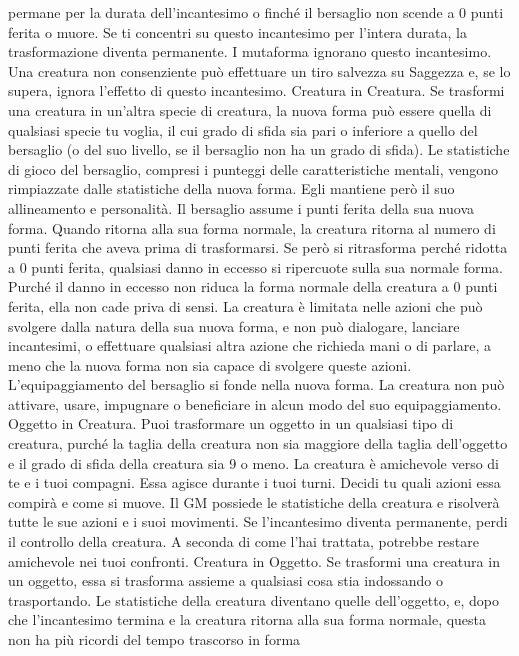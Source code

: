 \begin{multicols}{2}
permane per la durata dell’incantesimo o finché il
bersaglio non scende a 0 punti ferita o muore. Se ti
concentri su questo incantesimo per l’intera durata, la
trasformazione diventa permanente.
I mutaforma ignorano questo incantesimo. Una creatura
non consenziente può effettuare un tiro salvezza su
Saggezza e, se lo supera, ignora l’effetto di questo
incantesimo.
Creatura in Creatura. Se trasformi una creatura in
un’altra specie di creatura, la nuova forma può essere
quella di qualsiasi specie tu voglia, il cui grado di sfida
sia pari o inferiore a quello del bersaglio (o del suo
livello, se il bersaglio non ha un grado di sfida). Le
statistiche di gioco del bersaglio, compresi i punteggi
delle caratteristiche mentali, vengono rimpiazzate dalle
statistiche della nuova forma. Egli mantiene però il suo
allineamento e personalità.
Il bersaglio assume i punti ferita della sua nuova forma.
Quando ritorna alla sua forma normale, la creatura
ritorna al numero di punti ferita che aveva prima di
trasformarsi. Se però si ritrasforma perché ridotta a 0
punti ferita, qualsiasi danno in eccesso si ripercuote
sulla sua normale forma. Purché il danno in eccesso
non riduca la forma normale della creatura a 0 punti
ferita, ella non cade priva di sensi.
La creatura è limitata nelle azioni che può svolgere
dalla natura della sua nuova forma, e non può
dialogare, lanciare incantesimi, o effettuare qualsiasi
altra azione che richieda mani o di parlare, a meno che
la nuova forma non sia capace di svolgere queste
azioni.
L’equipaggiamento del bersaglio si fonde nella nuova
forma. La creatura non può attivare, usare, impugnare o
beneficiare in alcun modo del suo equipaggiamento.
Oggetto in Creatura. Puoi trasformare un oggetto in un
qualsiasi tipo di creatura, purché la taglia della creatura
non sia maggiore della taglia dell’oggetto e il grado di
sfida della creatura sia 9 o meno. La creatura è
amichevole verso di te e i tuoi compagni. Essa agisce
durante i tuoi turni. Decidi tu quali azioni essa compirà e
come si muove. Il GM possiede le statistiche della
creatura e risolverà tutte le sue azioni e i suoi
movimenti.
Se l’incantesimo diventa permanente, perdi il controllo
della creatura. A seconda di come l’hai trattata,
potrebbe restare amichevole nei tuoi confronti.
Creatura in Oggetto. Se trasformi una creatura in un
oggetto, essa si trasforma assieme a qualsiasi cosa stia
indossando o trasportando. Le statistiche della creatura
diventano quelle dell’oggetto, e, dopo che l’incantesimo
termina e la creatura ritorna alla sua forma normale,
questa non ha più ricordi del tempo trascorso in forma

\end{multicols}
